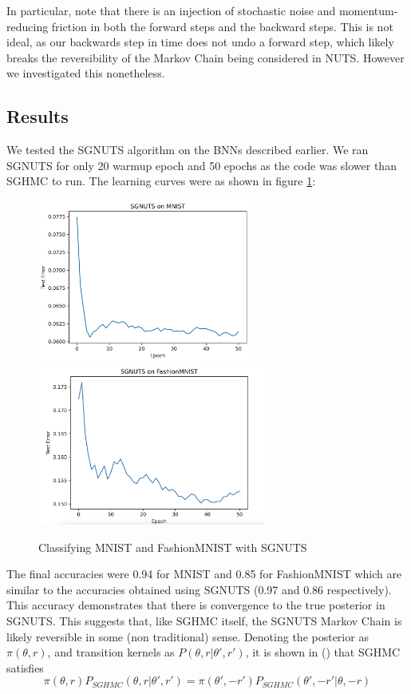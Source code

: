 In particular, note that there is an injection of stochastic noise and momentum-reducing friction in both the forward steps and the backward steps. This is not ideal, as our backwards step in time does not undo a forward step, which likely breaks the reversibility of the Markov Chain being considered in NUTS. However we investigated this nonetheless.

\subsection{Results} 

We tested the SGNUTS algorithm on the BNNs described earlier. We ran SGNUTS for only 20 warmup epoch and 50 epochs as the code was slower than SGHMC to run. The learning curves were as shown in figure \ref{SGNUTS_results}:

\begin{figure}[h!]
\centering
\includegraphics[width=70mm]{parts/Images/SGNUTS_MNIST.png}
\includegraphics[width=75mm]{parts/Images/SGNUTS_Fashion.png}
\caption{Classifying MNIST and FashionMNIST with SGNUTS}
\label{SGNUTS_results}
\end{figure}

The final accuracies were 0.94 for MNIST and 0.85 for FashionMNIST which are similar to the accuracies obtained using SGNUTS (0.97 and 0.86 respectively). This accuracy demonstrates that there is convergence to the true posterior in SGNUTS. This suggests that, like SGHMC itself, the SGNUTS Markov Chain is likely reversible in some (non traditional) sense. Denoting the posterior as $\pi(\theta, r)$, and transition kernels as $P(\theta, r| \theta', r')$, it is shown in (\cite{sghmc}) that SGHMC satisfies
$$ \pi(\theta,r)P_{SGHMC}(\theta,r|\theta',r') = \pi(\theta',-r')P_{SGHMC}(\theta',-r'|\theta,-r)$$

